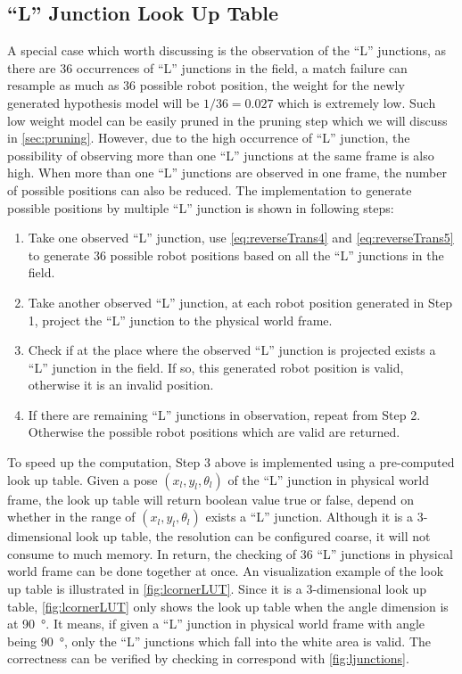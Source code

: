 \subsection{``L'' Junction Look Up Table}
\label{sub:Junction Look Up Table}
A special case which worth discussing is the observation of the ``L'' junctions, as there are 36 occurrences of ``L'' junctions in the field, a match failure can resample as much as 36 possible robot position, the weight for the newly generated hypothesis model will be $1/36=0.027$ which is extremely low. Such low weight model can be easily pruned in the pruning step which we will discuss in \autoref{sec:pruning}. However, due to the high occurrence of ``L'' junction, the possibility of observing more than one ``L'' junctions at the same frame is also high. When more than one ``L'' junctions are observed in one frame, the number of possible positions can also be reduced. The implementation to generate possible positions by multiple ``L'' junction is shown in following steps:

\begin{enumerate}
  \item Take one observed ``L'' junction, use \autoref{eq:reverseTrans4} and \autoref{eq:reverseTrans5} to generate 36 possible robot positions based on all the ``L'' junctions in the field. 
  \item Take another observed ``L'' junction, at each robot position generated in Step 1, project the ``L'' junction to the physical world frame.
  \item Check if at the place where the observed ``L'' junction  is projected exists a  ``L'' junction in the field. If so, this generated robot position is valid, otherwise it is an invalid position.
  \item If there are  remaining ``L'' junctions in observation, repeat from Step 2. Otherwise the possible robot positions which are valid are returned.
\end{enumerate}

To speed up the computation, Step 3 above is implemented using a pre-computed look up table. Given a pose $(x_l, y_l, \theta_l)$ of the ``L'' junction in physical world frame,  the look up table will return boolean value true or false, depend on whether in the range of $(x_l, y_l, \theta_l)$ exists a ``L'' junction. Although it is a 3-dimensional look up table, the resolution can be configured coarse, it will not consume to much memory. In return, the checking of 36 ``L'' junctions in physical world frame can be done together at once. An visualization example of the look up table is illustrated in \autoref{fig:lcornerLUT}. Since it is a 3-dimensional look up table, \autoref{fig:lcornerLUT} only shows the look up table when the angle dimension is at \SI{90}{\degree}. It means, if given a ``L'' junction in physical world frame with angle being \SI{90}{\degree}, only the ``L'' junctions which fall into the white area is valid. The correctness can be verified by checking in correspond with \autoref{fig:ljunctions}.

